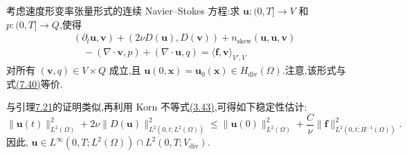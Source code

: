 \begin{note}[连续方程]
\label{note:vms-coarse-projection-continuous-equation}
考虑速度形变率张量形式的连续 Navier--Stokes 方程:求
$\bm u:(0,T]\to V$ 和 $p:(0,T]\to Q$,使得
\begin{equation}\label{eq:vms-coarse-projection-continuous-equation}
\begin{aligned}
 &(\partial_t\bm u,\bm v)
 +(2\nu D(\bm u),D(\bm v))
 +n_{\mathrm{skew}}(\bm u,\bm u,\bm v)\\
 &\quad-(\nabla\cdot\bm v,p)
 +(\nabla\cdot\bm u,q)
 =\langle\bm f,\bm v\rangle_{V',V}
\end{aligned}
\end{equation}
对所有 $(\bm v,q)\in V\times Q$ 成立,且
$\bm u(0,\bm x)=\bm u_0(\bm x)\in H_{\mathrm{div}}(\Omega)$.注意,该形式与式\hyperref[eq:time-dependent-time-continuous-weak]{(7.40)}等价.

与引理\hyperref[lem:time-dependent-energy-stability]{7.21}的证明类似,再利用 Korn 不等式\hyperref[eq:korn-inequality-v]{(3.43)},可得如下稳定性估计:
\begin{equation}\label{eq:vms-coarse-projection-continuous-stability}
\|\bm u(t)\|_{L^2(\Omega)}^2
 +2\nu\|D(\bm u)\|_{L^2(0,t;L^2(\Omega))}^2
 \le
 \|\bm u(0)\|_{L^2(\Omega)}^2
 +\frac{C}{\nu}
   \|\bm f\|_{L^2(0,t;H^{-1}(\Omega))}^2.
\end{equation}
因此,
$\bm u\in L^\infty(0,T;L^2(\Omega))\cap L^2(0,T;V_{\mathrm{div}})$.
\end{note}

